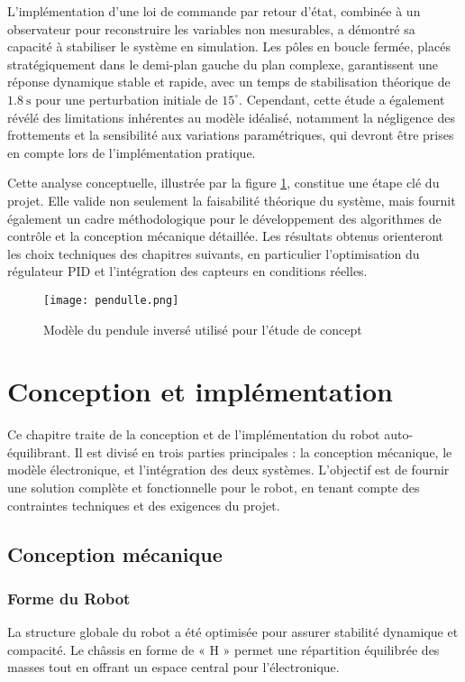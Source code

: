 \documentclass{report}
\begin{document}
L’implémentation d’une loi de commande par retour d’état, combinée à un observateur pour reconstruire les variables non mesurables, a démontré sa capacité à stabiliser le système en simulation. Les pôles en boucle fermée, placés stratégiquement dans le demi-plan gauche du plan complexe, garantissent une réponse dynamique stable et rapide, avec un temps de stabilisation théorique de \(1.8\ \text{s}\) pour une perturbation initiale de \(15^\circ\). Cependant, cette étude a également révélé des limitations inhérentes au modèle idéalisé, notamment la négligence des frottements et la sensibilité aux variations paramétriques, qui devront être prises en compte lors de l’implémentation pratique.  

Cette analyse conceptuelle, illustrée par la figure \ref{fig:modele_pendule}, constitue une étape clé du projet. Elle valide non seulement la faisabilité théorique du système, mais fournit également un cadre méthodologique pour le développement des algorithmes de contrôle et la conception mécanique détaillée. Les résultats obtenus orienteront les choix techniques des chapitres suivants, en particulier l’optimisation du régulateur PID et l’intégration des capteurs en conditions réelles.  

\begin{figure}[htbp]
    \centering
    \texttt{[image: pendulle.png]}
    \caption{Modèle du pendule inversé utilisé pour l’étude de concept}
    \label{fig:modele_pendule}
\end{figure}
\chapter{Conception et implémentation}


Ce chapitre traite de la conception et de l'implémentation du robot auto-équilibrant. Il est divisé en trois parties principales : la conception mécanique, le modèle électronique, et l'intégration des deux systèmes. L'objectif est de fournir une solution complète et fonctionnelle pour le robot, en tenant compte des contraintes techniques et des exigences du projet.
\section{Conception mécanique} 

\subsection{Forme du Robot}
La structure globale du robot a été optimisée pour assurer stabilité dynamique et compacité. Le châssis en forme de « H » permet une répartition équilibrée des masses tout en offrant un espace central pour l'électronique.
\end{document}
